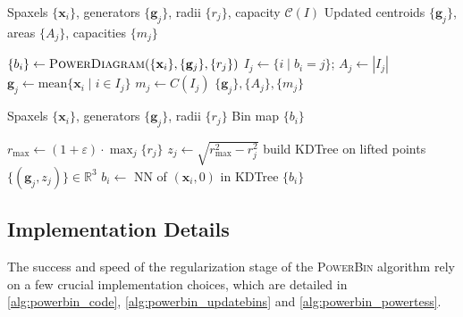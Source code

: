 \documentclass[fleqn,usenatbib]{mnras}
\begin{document}
\begin{algorithm}[t]
\caption{UpdateBins}
\label{alg:powerbin_updatebins}
\begin{algorithmic}
\Require Spaxels $\{\mathbf{x}_i\}$, generators $\{\mathbf{g}_j\}$, radii $\{r_j\}$, capacity $\mathcal{C}(I)$
\Ensure Updated centroids $\{\mathbf{g}_j\}$, areas $\{A_j\}$, capacities $\{m_j\}$

\State $\{b_i\} \gets \textsc{PowerDiagram}(\{\mathbf{x}_i\},\{\mathbf{g}_j\},\{r_j\})$
\State $I_j \gets \{i \mid b_i=j\}$; \quad $A_j \gets |I_j|$ 
\State $\mathbf{g}_j \gets \mathrm{mean}\{\mathbf{x}_i \mid i\in I_j\}$
\State $m_j \gets C(I_j)$
\State \Return $\{\mathbf{g}_j\},\{A_j\},\{m_j\}$
\end{algorithmic}
\end{algorithm}

\begin{algorithm}[t]
\caption{PowerDiagram}
\label{alg:powerbin_powertess}
\begin{algorithmic}
\Require Spaxels $\{\mathbf{x}_i\}$, generators $\{\mathbf{g}_j\}$, radii $\{r_j\}$
\Ensure Bin map $\{b_i\}$

\State $r_{\max} \gets  (1+\varepsilon)\cdot\max_j\{r_j\}$
\State $z_j \gets \sqrt{r_{\max}^2-r_j^2}$ 
\State build KDTree on lifted points $\{(\mathbf{g}_j,z_j)\} \in \mathbb{R}^3$
\State $b_i \gets$ NN of $(\mathbf{x}_i,0)$ in KDTree 
\State \Return $\{b_i\}$
\end{algorithmic}
\end{algorithm} 

\subsection{Implementation Details}
\label{sec:implementation_details}

The success and speed of the regularization stage of the \textsc{PowerBin} algorithm rely on a few crucial implementation choices, which are detailed in \autoref{alg:powerbin_code}, \ref{alg:powerbin_updatebins} and \ref{alg:powerbin_powertess}.
\end{document}
